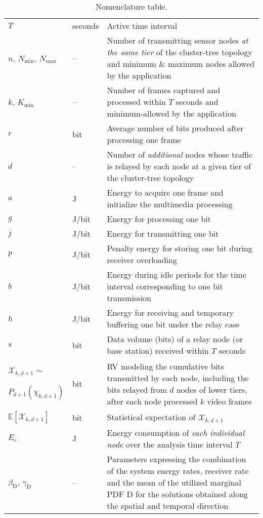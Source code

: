 \documentclass[twocolumn,english]{IEEEtran}
\providecommand{\tabularnewline}{\\}
\theoremstyle{plain}
\theoremstyle{definition}
\begin{document}
\begin{enumerate}[leftmargin=*]
\end{enumerate}

\begin{table}
\noindent \centering{}\caption{\label{tab:Nomenclature-table.1}Nomenclature table.}


\begin{tabular}{>{\centering}m{}>{\centering}m{}>{\raggedright}p{}}
\multicolumn{1}{>{\centering}m{0.15\columnwidth}}{Symbol } & \multicolumn{1}{>{\centering}m{0.07\columnwidth}}{Unit} & \multicolumn{1}{>{\raggedright}m{0.6\columnwidth}}{Definition}\tabularnewline
\midrule 
$T$  & seconds  & Active time interval \tabularnewline
\midrule 
$n$, $N_{\min}$, $N_{\max}$  & --  & Number of transmitting sensor nodes \emph{at the same tier} of the
cluster-tree topology and minimum \& maximum nodes allowed by the
application \tabularnewline
\midrule 
$k$, $K_{\min}$  & --  & Number of frames captured and processed within $T$ seconds and minimum-allowed
by the application\tabularnewline
\midrule 
$r$  & bit  & Average number of bits produced after processing one frame\tabularnewline
\midrule 
$d$  & --  & Number of \emph{additional} nodes whose traffic is relayed by each
node at a given tier of the cluster-tree topology \tabularnewline
\midrule 
$a$  & J  & Energy to acquire one frame and initialize the multimedia processing\tabularnewline
\midrule 
$g$  & J/bit  & Energy for processing one bit\tabularnewline
\midrule 
$j$  & J/bit  & Energy for transmitting one bit\tabularnewline
\midrule 
$p$  & J/bit  & Penalty energy for storing one bit during receiver overloading\tabularnewline
\midrule 
$b$  & J/bit  & Energy during idle periods for the time interval corresponding to
one bit transmission\tabularnewline
\midrule 
$h$  & J/bit  & Energy for receiving and temporary buffering one bit under the relay
case\tabularnewline
\midrule 
$s$  & bit  & Data volume (bits) of a relay node (or base station) received within
$T$ seconds\tabularnewline
\midrule 
$\mathcal{X}_{k,d+1}\sim$

$P_{d+1}\left(\chi_{k,d+1}\right)$  & bit  & RV modeling the cumulative bits transmitted by each node, including
the bits relayed from $d$ nodes of lower tiers, after each node processed
$k$ video frames \tabularnewline
\midrule 
$\mathbb{E}\left[\mathcal{X}_{k,d+1}\right]$  & bit  & Statistical expectation of $\mathcal{X}_{k,d+1}$\tabularnewline
\midrule 
$E_{c}$  & J  &  Energy consumption of \textsl{each individual node} over the analysis
time interval $T$\tabularnewline
\midrule 
$\beta_{\text{D}}$, $\gamma_{\text{D}}$  & --  & Parameters expressing the combination of the system energy rates,
receiver rate and the mean of the utilized marginal PDF $\text{D}$
for the solutions obtained along the spatial and temporal direction \tabularnewline
\bottomrule
\end{tabular}
\end{table}
\end{document}
